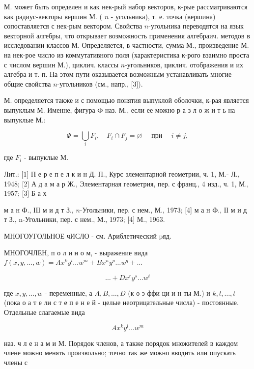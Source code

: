 \documentclass[10pt]{article}
\begin{document}
М. может быть определен и как нек-рый набор векторов, к-рые рассматриваются как радиус-векторы вершин М. ( $n$ - угольника), т. е. точка (вершина) сопоставляется с нек-рым вектором. Свойства $n$-угольника переводятся на язык векторной алгебры, что открывает возможность применения алгебраич. методов в исследовании классов М. Определяется, в частности, сумма М., произведение М. на нек-рое число из коммутативного поля (характеристика к-рого взаимно проста с числом вершин М.), циклич. классы $n$-угольников, циклич. отображения и их алгебра и т. п. На этом пути оказывается возможным устанавливать многие общие свойства $n$-угольников (см., напр., [3]).



М. определяется также и с помощью понятия выпуклой оболочки, к-рая является выпуклым М. Именне, фигура Ф наз. М., если ее можно р а з л о ж и т ь на выпуклые М.:



\[

\Phi=\bigcup_{i} F_{i}, \quad F_{i} \cap F_{j}=\varnothing \quad \text { при } \quad i \neq j,

\]



где $F_{i}$ - выпуклые М.



Лит.: [1] П е р е п е л к и н Д. П., Курс элементарной геометрии, ч. 1, М.- Л., 1948; [2] А д а м а р Ж., Элементарная геометрия, пер. с франц., 4 изд., ч. 1, М., 1957; [3] Б а х

м а н Ф., ІІІ м и д т З., $n$-Угольники, пер. с нем., М., 1973; [4] м а н Ф., ІІ м и д т З., n-Угольники, пер. с нем., М., 1973; [4] М., 1963.



МНОГОУГОЛЬНОЕ чИСЛО - см. Ариблетический pяд.



МНОГОЧЛЕН, п о л и н о м, - выражение вида $f(x, y, \ldots, w)=A x^{k} y^{l} \ldots w^{m}+B x^{n} y^{p} \ldots w^{q}+\ldots$



\[

\ldots+D x^{r} y^{s} \ldots w^{t}

\]



где $x, y, \ldots, w$ - переменные, а $A, B, \ldots, D$ (к о э ффи ци и н ты М.) и $k, l, \ldots, t$ (пока $о$ а т е ли с т е п е н е й - целые неотрицательные числа) - постоянные. Отдельные слагаемые вида



\[

A x^{k} y^{l} \ldots w^{m}

\]



наз. ч л е н а м и М. Порядок членов, а также порядок множителей в каждом члене можно менять произвольно; точно так же можно вводить или опускать члены с
\end{document}
